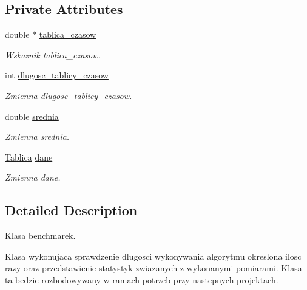 \subsection*{Private Attributes}
\begin{DoxyCompactItemize}
\item 
double $\ast$ \hyperlink{classbenchmark_ab8768783d6cb3c6e7a6f9d4127ce48eb}{tablica\+\_\+czasow}
\begin{DoxyCompactList}\small\item\em Wskaznik tablica\+\_\+czasow. \end{DoxyCompactList}\item 
int \hyperlink{classbenchmark_a7f50be921f00a618f498c7b78fee9bde}{dlugosc\+\_\+tablicy\+\_\+czasow}
\begin{DoxyCompactList}\small\item\em Zmienna dlugosc\+\_\+tablicy\+\_\+czasow. \end{DoxyCompactList}\item 
double \hyperlink{classbenchmark_a94d0b225401072e80f8e29d1bb5beb1d}{srednia}
\begin{DoxyCompactList}\small\item\em Zmienna srednia. \end{DoxyCompactList}\item 
\hyperlink{class_tablica}{Tablica} \hyperlink{classbenchmark_a300d21139d46ca60159c0105bb2504e9}{dane}
\begin{DoxyCompactList}\small\item\em Zmienna dane. \end{DoxyCompactList}\end{DoxyCompactItemize}


\subsection{Detailed Description}
Klasa benchmarek. 

Klasa wykonujaca sprawdzenie dlugosci wykonywania algorytmu okreslona ilosc razy oraz przedstawienie statystyk zwiazanych z wykonanymi pomiarami. Klasa ta bedzie rozbodowywany w ramach potrzeb przy nastepnych projektach. 

